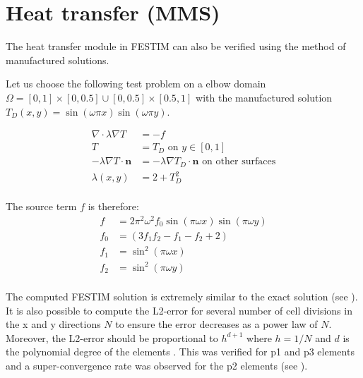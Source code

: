 \section{Heat transfer (MMS)}


The heat transfer module in FESTIM can also be verified using the method of manufactured solutions.

Let us choose the following test problem on a elbow domain $\Omega = [0, 1] \times [0, 0.5] \cup [0, 0.5] \times [0.5, 1]$ with the manufactured solution $T_D(x, y) = \sin(\omega \pi x) \sin(\omega \pi y)$.

\begin{align}
    \nabla \cdot \lambda \nabla T &= -f \\
    T &= T_D \text{  on  } y \in [0, 1] \\
    -\lambda \nabla T \cdot \mathbf{n} &= -\lambda \nabla T_D \cdot \mathbf{n} \text{  on  other surfaces} \\
    \lambda(x, y) &= 2 + T_D^2 \\
\end{align}

The source term $f$ is therefore:
\begin{align}
    f &= 2 \pi^{2} \omega^{2} f_0 \sin{\left (\pi \omega x \right )} \sin{\left (\pi \omega y \right )} \\
    f_0 &= \left(3 f_1 f_2 - f_1 - f_2 + 2\right) \\
    f_1 &= \sin^{2}{\left (\pi \omega x \right )} \\
    f_2 &= \sin^{2}{\left (\pi \omega y \right )} \\
\end{align}

The computed FESTIM solution is extremely similar to the exact solution (see ).
It is also possible to compute the L2-error for several number of cell divisions in the x and y directions $N$ to ensure the error decreases as a power law of $N$.
Moreover, the L2-error should be proportional to $h^{d+1}$ where $h=1/N$ and $d$ is the polynomial degree of the elements .
This was verified for \gls{p1} and \gls{p3} elements and a super-convergence rate was observed for the \gls{p2} elements (see ).

